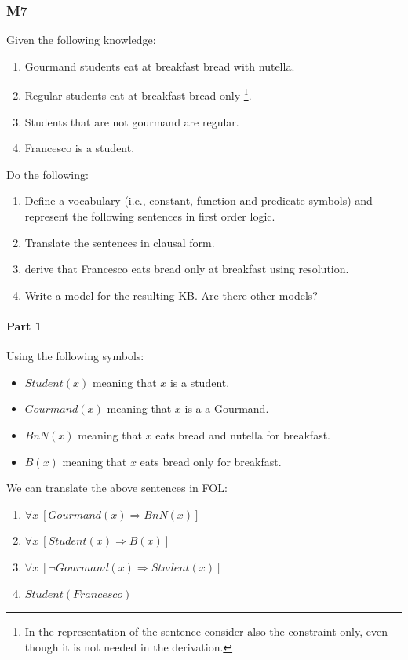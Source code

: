 \documentclass[10pt,a4paper]{article}
\begin{document}
\begin{enumerate}
\subsubsection{M7}
Given the following knowledge:
\begin{enumerate}[label=\arabic*]
\item Gourmand students eat at breakfast bread with nutella.
\item Regular students eat at breakfast bread only \footnote{In the representation of the sentence consider also the constraint only, even though it is not needed in the derivation.}.
\item Students that are not gourmand are regular.
\item  Francesco is a student.
\end{enumerate}

Do the following:
\begin{enumerate}[label=(\alph*)]
\item  Define a vocabulary (i.e., constant, function and predicate symbols) and represent the following sentences in first order logic.
\item Translate the sentences in clausal form.
\item derive that Francesco eats bread only at breakfast using resolution.
\item Write a model for the resulting KB. Are there other models?

\end{enumerate}

\paragraph{Part 1}

Using the following symbols:
\begin{itemize}
\item $Student(x)$ meaning that $x$ is a student.
\item $Gourmand(x)$ meaning that $x$ is a a Gourmand.
\item $BnN(x)$ meaning that $x$ eats bread and nutella for breakfast.
\item $B(x)$ meaning that $x$ eats bread only for breakfast.
\end{itemize}

We can translate the above sentences in FOL:
\begin{enumerate}
\item $\forall x\ [Gourmand(x) \Rightarrow BnN(x)]$
\item $\forall x\ [Student(x) \Rightarrow B(x)]$
\item $\forall x\ [\neg Gourmand(x) \Rightarrow Student(x)]$
\item $Student(Francesco)$
\end{enumerate}


\end{enumerate}
\end{document}
